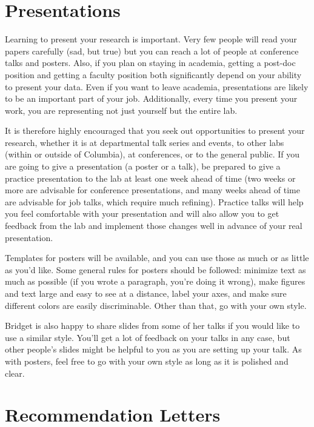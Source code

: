 \documentclass[]{book}
\begin{document}
\hypertarget{presentations}{%
\section{Presentations}\label{presentations}}

Learning to present your research is important. Very few people will read your papers carefully (sad, but true) but you can reach a lot of people at conference talks and posters. Also, if you plan on staying in academia, getting a post-doc position and getting a faculty position both significantly depend on your ability to present your data. Even if you want to leave academia, presentations are likely to be an important part of your job. Additionally, every time you present your work, you are representing not just yourself but the entire lab.

It is therefore highly encouraged that you seek out opportunities to present your research, whether it is at departmental talk series and events, to other labs (within or outside of Columbia), at conferences, or to the general public. If you are going to give a presentation (a poster or a talk), be prepared to give a practice presentation to the lab at least one week ahead of time (two weeks or more are advisable for conference presentations, and many weeks ahead of time are advisable for job talks, which require much refining). Practice talks will help you feel comfortable with your presentation and will also allow you to get feedback from the lab and implement those changes well in advance of your real presentation.

Templates for posters will be available, and you can use those as much or as little as you'd like. Some general rules for posters should be followed: minimize text as much as possible (if you wrote a paragraph, you're doing it wrong), make figures and text large and easy to see at a distance, label your axes, and make sure different colors are easily discriminable. Other than that, go with your own style.

Bridget is also happy to share slides from some of her talks if you would like to use a similar style. You'll get a lot of feedback on your talks in any case, but other people's slides might be helpful to you as you are setting up your talk. As with posters, feel free to go with your own style as long as it is polished and clear.

\hypertarget{recommendation-letters}{%
\section{Recommendation Letters}\label{recommendation-letters}}
\end{document}
